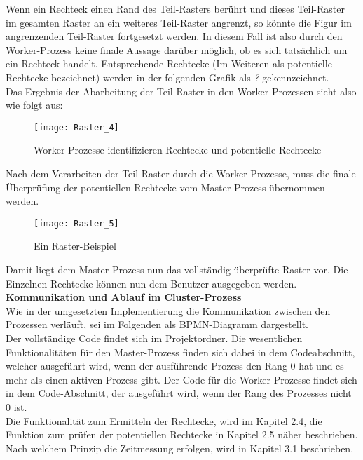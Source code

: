 \documentclass[
10pt, %
a4paper, %
oneside, %
headinclude,footinclude, %
BCOR5mm, %
]{scrartcl}
\begin{document}
Wenn ein Rechteck einen Rand des Teil-Rasters berührt und dieses Teil-Raster im gesamten Raster an ein weiteres Teil-Raster angrenzt, so könnte die Figur im angrenzenden Teil-Raster fortgesetzt werden. In diesem Fall ist also durch den Worker-Prozess keine finale Aussage darüber möglich, ob es sich tatsächlich um ein Rechteck handelt. Entsprechende Rechtecke (Im Weiteren als potentielle Rechtecke bezeichnet) werden in der folgenden Grafik als \textit{?} gekennzeichnet.\\
Das Ergebnis der Abarbeitung der Teil-Raster in den Worker-Prozessen sieht also wie folgt aus:

\begin{figure}[h]
	\centering 
	\texttt{[image: Raster\_4]} 
	\caption[Cluster-Prozess: Worker-Prozess: Rechtecke und potentielle Rechtecke]{Worker-Prozesse identifizieren Rechtecke und potentielle Rechtecke}
\end{figure}

Nach dem Verarbeiten der Teil-Raster durch die Worker-Prozesse, muss die finale Überprüfung der potentiellen Rechtecke vom Master-Prozess übernommen werden.

\begin{figure}[h]
	\centering 
	\texttt{[image: Raster\_5]} 
	\caption[Cluster-Prozess: Beispiel-Raster]{Ein Raster-Beispiel }
\end{figure}

Damit liegt dem Master-Prozess nun das vollständig überprüfte Raster vor. Die Einzelnen Rechtecke können nun dem Benutzer ausgegeben werden.\\

\textbf{Kommunikation und Ablauf im Cluster-Prozess }\\
Wie in der umgesetzten Implementierung die Kommunikation zwischen den Prozessen verläuft, sei im Folgenden als BPMN-Diagramm dargestellt.\\

Der vollständige Code findet sich im Projektordner. Die wesentlichen Funktionalitäten für den Master-Prozess finden sich dabei in dem Codeabschnitt, welcher ausgeführt wird, wenn der ausführende Prozess den Rang 0 hat und es mehr als einen aktiven Prozess gibt. Der Code für die Worker-Prozesse findet sich in dem Code-Abschnitt, der ausgeführt wird, wenn der Rang des Prozesses nicht 0 ist.\\

Die Funktionalität zum Ermitteln der Rechtecke, wird im Kapitel 2.4, die Funktion zum prüfen der potentiellen Rechtecke in Kapitel 2.5 näher beschrieben. Nach welchem Prinzip die Zeitmessung erfolgen, wird in Kapitel 3.1 beschrieben.
\end{document}
